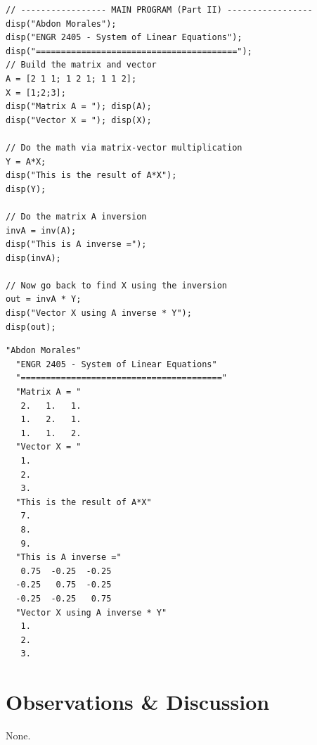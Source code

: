 \documentclass[11pt]{article}
\begin{document}
\begin{lstlisting}[style=scilab, caption={SciLab Part II}]
// ----------------- MAIN PROGRAM (Part II) -----------------
disp("Abdon Morales");
disp("ENGR 2405 - System of Linear Equations");
disp("========================================");
// Build the matrix and vector
A = [2 1 1; 1 2 1; 1 1 2];
X = [1;2;3];
disp("Matrix A = "); disp(A);
disp("Vector X = "); disp(X);

// Do the math via matrix-vector multiplication
Y = A*X;
disp("This is the result of A*X");
disp(Y);

// Do the matrix A inversion
invA = inv(A);
disp("This is A inverse =");
disp(invA);

// Now go back to find X using the inversion
out = invA * Y;
disp("Vector X using A inverse * Y");
disp(out);
\end{lstlisting}

\begin{lstlisting}[caption={SciLab Part II runtime output}]
  "Abdon Morales"
  "ENGR 2405 - System of Linear Equations"
  "========================================"
  "Matrix A = "
   2.   1.   1.
   1.   2.   1.
   1.   1.   2.
  "Vector X = "
   1.
   2.
   3.
  "This is the result of A*X"
   7.
   8.
   9.
  "This is A inverse ="
   0.75  -0.25  -0.25
  -0.25   0.75  -0.25
  -0.25  -0.25   0.75
  "Vector X using A inverse * Y"
   1.
   2.
   3.

\end{lstlisting}

\section*{Observations \& Discussion}

None.

\end{document}
